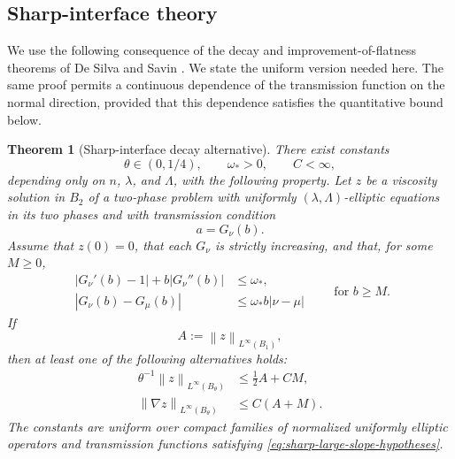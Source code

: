 \documentclass[11pt,letterpaper]{amsart}
\numberwithin{equation}{section}
\newcommand{\norm}[1]{\left\lVert #1\right\rVert}
\newtheorem{theorem}{Theorem}[section]
\theoremstyle{definition}
\theoremstyle{remark}
\begin{document}
\subsection{Sharp-interface theory}

We use the following consequence of the decay and improvement-of-flatness
theorems of De Silva and Savin \cite{DeSilvaSavin}. We state the uniform
version needed here. The same proof permits a continuous
dependence of the transmission function on the normal direction, provided
that this dependence satisfies the quantitative bound below.

\begin{theorem}[Sharp-interface decay alternative]
\label{thm:sharp-decay-alternative}
There exist constants
$$
\theta\in(0,1/4),
\qquad
\omega_*>0,
\qquad
C<\infty,
$$
depending only on $n$, $\lambda$, and $\Lambda$, with the following
property. Let $z$ be a viscosity solution in $B_2$ of a two-phase problem
with uniformly $(\lambda,\Lambda)$-elliptic equations in its two phases and
with transmission condition
$$
a=G_\nu(b).
$$
Assume that $z(0)=0$, that each $G_\nu$ is strictly increasing, and that,
for some $M\geq0$,
\begin{equation}\label{eq:sharp-large-slope-hypotheses}
\begin{split}
|G_\nu'(b)-1|+b|G_\nu''(b)|
&\leq\omega_*,
\\
|G_\nu(b)-G_\mu(b)|
&\leq\omega_*b|\nu-\mu|
\end{split}
\qquad
\text{for }b\geq M.
\end{equation}
If
$$
A:=\norm{z}_{L^\infty(B_1)},
$$
then at least one of the following alternatives holds:
\begin{align}
\theta^{-1}\norm{z}_{L^\infty(B_\theta)}
&\leq
\frac12A+CM,
\label{eq:sharp-decay}
\\
\norm{\nabla z}_{L^\infty(B_\theta)}
&\leq
C(A+M).
\label{eq:sharp-lipschitz}
\end{align}
The constants are uniform over compact families of normalized uniformly
elliptic operators and transmission functions satisfying
\eqref{eq:sharp-large-slope-hypotheses}.
\end{theorem}
\end{document}
